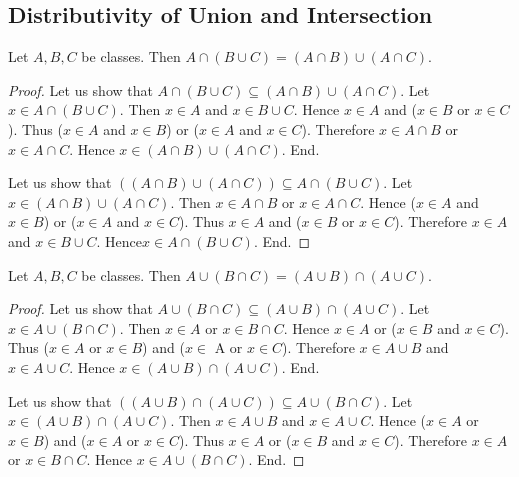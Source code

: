 \documentclass[10pt]{article}
\begin{document}
  \subsection*{Distributivity of Union and Intersection}

  \begin{forthel}
    \begin{proposition}[id=FOUNDATIONS_02_371139087958016,printid]
      Let $A, B, C$ be classes.
      Then $A \cap (B \cup C) = (A \cap B) \cup (A \cap C)$.
    \end{proposition}
    \begin{proof}
      Let us show that $A \cap (B \cup C) \subseteq (A \cap B) \cup (A \cap C)$.
        Let $x \in A \cap (B \cup C)$.
        Then $x \in A$ and $x \in B \cup C$.
        Hence $x \in A$ and ($x \in B$ or $x \in C$).
        Thus ($x \in A$ and $x \in B$) or ($x \in A$ and $x \in C$).
        Therefore $x \in A \cap B$ or $x \in A \cap C$.
        Hence $x \in (A \cap B) \cup (A \cap C)$.
      End.

      Let us show that $((A \cap B) \cup (A \cap C)) \subseteq A \cap (B \cup C)$. %
        Let $x \in (A \cap B) \cup (A \cap C)$.
        Then $x \in A \cap B$ or $x \in A \cap C$.
        Hence ($x \in A$ and $x \in B$) or ($x \in A$ and $x \in C$).
        Thus $x \in A$ and ($x \in B$ or $x \in C$).
        Therefore $x \in A$ and $x \in B \cup C$.
        Hence$ x \in A \cap (B \cup C)$.
      End.
    \end{proof}
  \end{forthel}

  \begin{forthel}
    \begin{proposition}[id=FOUNDATIONS_02_5937390721957888,printid]
      Let $A, B, C$ be classes.
      Then $A \cup (B \cap C) = (A \cup B) \cap (A \cup C)$.
    \end{proposition}
    \begin{proof}
      Let us show that $A \cup (B \cap C) \subseteq (A \cup B) \cap (A \cup C)$.
        Let $x \in A \cup (B \cap C)$.
        Then $x \in A$ or $x \in B \cap C$.
        Hence $x \in A$ or ($x \in B$ and $x \in C$).
        Thus ($x \in A$ or $x \in B$) and ($x \in$ A or $x \in C$).
        Therefore $x \in A \cup B$ and $x \in A \cup C$.
        Hence $x \in (A \cup B) \cap (A \cup C)$.
      End.

      Let us show that $((A \cup B) \cap (A \cup C)) \subseteq A \cup (B \cap C)$. %
        Let $x \in (A \cup B) \cap (A \cup C)$.
        Then $x \in A \cup B$ and $x \in A \cup C$.
        Hence ($x \in A$ or $x \in B$) and ($x \in A$ or $x \in C$).
        Thus $x \in A$ or ($x \in B$ and $x \in C$).
        Therefore $x \in A$ or $x \in B \cap C$.
        Hence $x \in A \cup (B \cap C)$.
      End.
    \end{proof}
  \end{forthel}
\end{document}
